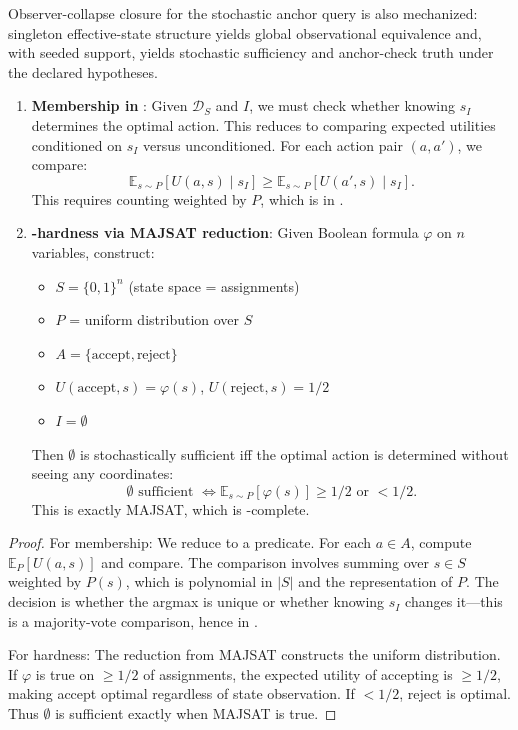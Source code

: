
Observer-collapse closure for the stochastic anchor query is also mechanized: singleton effective-state structure yields global observational equivalence and, with seeded support, yields stochastic sufficiency and anchor-check truth under the declared hypotheses.

\begin{enumerate}
\item \textbf{Membership in \PP}: Given $\mathcal{D}_S$ and $I$, we must check whether knowing $s_I$ determines the optimal action. This reduces to comparing expected utilities conditioned on $s_I$ versus unconditioned. For each action pair $(a, a')$, we compare:
\[
\mathbb{E}_{s \sim P}[U(a,s) \mid s_I] \geq \mathbb{E}_{s \sim P}[U(a',s) \mid s_I].
\]
This requires counting weighted by $P$, which is in \PP.

\item \textbf{\PP-hardness via MAJSAT reduction}: Given Boolean formula $\varphi$ on $n$ variables, construct:
\begin{itemize}
\item $S = \{0,1\}^n$ (state space = assignments)
\item $P$ = uniform distribution over $S$
\item $A = \{\text{accept}, \text{reject}\}$
\item $U(\text{accept}, s) = \varphi(s)$, $U(\text{reject}, s) = 1/2$
\item $I = \emptyset$
\end{itemize}
Then $\emptyset$ is stochastically sufficient iff the optimal action is determined without seeing any coordinates:
\[
\emptyset \text{ sufficient } \iff \mathbb{E}_{s \sim P}[\varphi(s)] \geq 1/2 \text{ or } < 1/2.
\]
This is exactly MAJSAT, which is \PP-complete.
\end{enumerate}


\begin{proof}
For membership: We reduce to a \PP predicate. For each $a \in A$, compute $\mathbb{E}_P[U(a,s)]$ and compare. The comparison involves summing over $s \in S$ weighted by $P(s)$, which is polynomial in $|S|$ and the representation of $P$. The decision is whether the argmax is unique or whether knowing $s_I$ changes it---this is a majority-vote comparison, hence in \PP.

For hardness: The reduction from MAJSAT constructs the uniform distribution. If $\varphi$ is true on $\geq 1/2$ of assignments, the expected utility of accepting is $\geq 1/2$, making accept optimal regardless of state observation. If $< 1/2$, reject is optimal. Thus $\emptyset$ is sufficient exactly when MAJSAT is true.
\end{proof}

